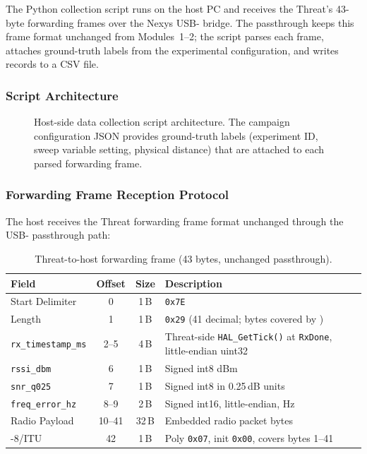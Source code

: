 \documentclass[11pt,letterpaper]{article}
\begin{document}
	The Python collection script runs on the host PC and receives the Threat's 43-byte forwarding frames over the Nexys USB-\UART{} bridge. The \FPGA{} passthrough keeps this frame format unchanged from Modules~1--2; the script parses each frame, attaches ground-truth labels from the experimental configuration, and writes records to a CSV file.

	\subsubsection{Script Architecture}

	\begin{figure}[ht!]
		\centering
		\caption{Host-side data collection script architecture. The campaign configuration JSON provides ground-truth labels (experiment ID, sweep variable setting, physical distance) that are attached to each parsed forwarding frame.}
		\label{fig:collection_script}
	\end{figure}

	\subsubsection{Forwarding Frame Reception Protocol}

	The host receives the Threat forwarding frame format unchanged through the \FPGA{} USB-\UART{} passthrough path:

	\begin{table}[ht!]
		\centering
		\caption{Threat-to-host forwarding frame (43 bytes, unchanged passthrough).}
		\label{tab:export_frame}
		\renewcommand{\arraystretch}{1.3}
		\begin{tabularx}{\textwidth}{l c c X}
			\toprule
			\textbf{Field} & \textbf{Offset} & \textbf{Size} & \textbf{Description} \\
			\midrule
			Start Delimiter & 0 & 1\,B & \texttt{0x7E} \\
			Length & 1 & 1\,B & \texttt{0x29} (41 decimal; bytes covered by \CRC{}) \\
			\texttt{rx\_timestamp\_ms} & 2--5 & 4\,B & Threat-side \texttt{HAL\_GetTick()} at \texttt{RxDone}, little-endian uint32 \\
			\texttt{rssi\_dbm} & 6 & 1\,B & Signed int8 dBm \\
			\texttt{snr\_q025} & 7 & 1\,B & Signed int8 in 0.25\,dB units \\
			\texttt{freq\_error\_hz} & 8--9 & 2\,B & Signed int16, little-endian, Hz \\
			Radio Payload & 10--41 & 32\,B & Embedded radio packet bytes \\
			\CRC{}-8/ITU & 42 & 1\,B & Poly \texttt{0x07}, init \texttt{0x00}, covers bytes 1--41 \\
			\bottomrule
		\end{tabularx}
	\end{table}
\end{document}
